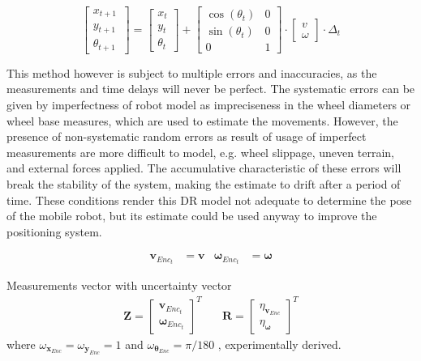 \begin{equation}
\begin{bmatrix} x_{t + 1} \\ y_{t + 1} \\ \theta _{t + 1} ~ \end{bmatrix}
=
\begin{bmatrix} {x_t} \\ {y_t} \\ {\theta _t}  \end{bmatrix}
+
\begin{bmatrix}  \cos (\theta _t ) & 0\\  \sin (\theta _t ) & 0 \\ 0 & 1 \end{bmatrix}
\cdot
\begin{bmatrix} v \\ \omega \end{bmatrix} \cdot
\Delta_t
\label{eq:eulerWheel}
\end{equation}


This method however is subject to multiple errors and inaccuracies, as the measurements and time delays will never be perfect.
The systematic errors can be given by imperfectness of robot model as impreciseness in the wheel diameters or wheel base measures, which are used to estimate the movements.
However, the presence of non-systematic random errors as result of usage of imperfect measurements are more difficult to model, e.g. wheel slippage, uneven terrain, and external forces applied.
The accumulative characteristic of these errors will break the stability of the system, making the estimate to drift after a period of time.
These conditions render this \gls{DR} model not adequate to determine the pose of the mobile robot, but its estimate could be used anyway to improve the positioning system.


\begin{align}
\mathbf{v}_{Enc_t} & = \mathbf{v} &
\boldsymbol \omega_{Enc_t} & = \boldsymbol \omega
\end{align}


Measurements vector with uncertainty vector
\begin{align}
\mathbf{Z}
=
\begin{bmatrix}
\mathbf{v}_{Enc_t} \\
\boldsymbol \omega_{Enc_t}
\end{bmatrix}^T
& \quad
\mathbf{R}
=
\begin{bmatrix}
\eta_{\mathbf{v}_{Enc}} \\
\eta_{\boldsymbol \omega}
\end{bmatrix}^T
\end{align}
where $ \omega_{\mathbf{x}_{Enc}} = \omega_{\mathbf{y}_{Enc}} = 1$ and
$ \omega_{\boldsymbol \theta_{Enc}} = \pi/180 $ , experimentally derived.


